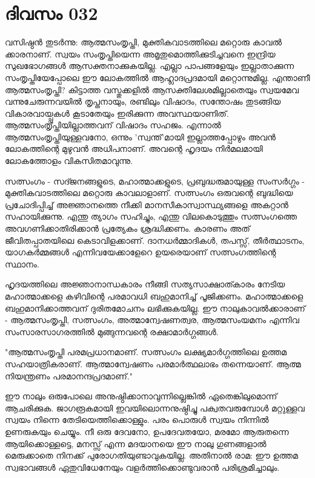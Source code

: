 \newpage
\section{ദിവസം 032}


വസിഷ്ഠന്‍ തുടര്‍ന്നു: ആത്മസംതൃപ്തി, മുക്തികവാടത്തിലെ മറ്റൊരു കാവല്‍ ക്കാരനാണ്‌. സ്വയം സംതൃപ്തിയെന്ന അമൃതുമൊത്തിക്കുടിച്ചവനെ ഇന്ദ്രിയ  സുഖഭോഗങ്ങള്‍ ആസക്തനാക്കുകയില്ല. എല്ലാ പാപങ്ങളേയും ഇല്ലാതാക്കുന്ന സംതൃപ്തിയേപ്പോലെ ഈ ലോകത്തില്‍ ആഹ്ലാദപ്രദമായി മറ്റൊന്നുമില്ല. എന്താണീ ആത്മസംതൃപ്തി? കിട്ടാത്ത വസ്തുക്കളില്‍ ആസക്തിലേശമില്ലാതെയും സ്വയമേവ വന്നുചേരുന്നവയില്‍ തൃപ്തനായും, രണ്ടിലും വിഷാദം, സന്തോഷം തുടങ്ങിയ വികാരവായ്പ്പുകള്‍ കൂടാതേയും ഇരിക്കുന്ന അവസ്ഥയാണിത്‌. ആത്മസംതൃപ്തിയില്ലാത്തവന്‌ വിഷാദം സഹജം. എന്നാല്‍ ആത്മസംതൃപ്തിയുള്ളവനോ, ഒന്നും 'സ്വന്ത്‌'മായി ഇല്ലാത്തപ്പോഴും അവന്‍ ലോകത്തിന്റെ മുഴുവന്‍ അധിപനാണ്‌. അവന്റെ ഹൃദയം നിര്‍മലമായി ലോകത്തോളം വികസിതമാവുന്നു.

സത്സംഗം - സദ്ജനങ്ങളുടെ, മഹാത്മാക്കളുടെ, പ്രബുദ്ധരുമായുള്ള സംസര്‍ഗ്ഗം - മുക്തികവാടത്തിലെ മറ്റൊരു കാവലാളാണ്‌. സത്സംഗം ഒരുവന്റെ ബുദ്ധിയെ പ്രചോദിപ്പിച്ച്‌ അജ്ഞാനത്തെ നീക്കി മാനസീകാസ്വാസ്ഥ്യങ്ങളെ അകറ്റാന്‍ സഹായിക്കുന്നു. എന്തു ത്യാഗം സഹിച്ചും, എന്തു വിലകൊടുത്തും സത്സംഗത്തെ അവഗണിക്കാതിരിക്കാന്‍ പ്രത്യേകം ശ്രദ്ധിക്കണം. കാരണം അത്‌ ജീവിതപ്പാതയിലെ കെടാവിളക്കാണ്‌. ദാനധര്‍മ്മാദികള്‍, തപസ്സ്‌, തീര്‍ത്ഥാടനം, യാഗകര്‍മ്മങ്ങള്‍ എന്നിവയേക്കാളേറെ ഉയരെയാണ്‌ സത്സംഗത്തിന്റെ സ്ഥാനം.

ഹൃദയത്തിലെ അജ്ഞാനാന്ധകാരം നീങ്ങി സത്യസാക്ഷാത്കാരം നേടിയ മഹാത്മാക്കളെ കഴിവിന്റെ പരമാവധി ബഹുമാനിച്ച്‌ പൂജിക്കണം. മഹാത്മാക്കളെ ബഹുമാനിക്കാത്തവന്‌ ദുരിതമോചനം ലഭിക്കുകയില്ല. ഈ നാലുകാവല്‍ക്കാരാണ്‌ - ആത്മസംതൃപ്തി, സത്സംഗം, അത്മാന്വേഷണത്വര, ആത്മസംയമനം എന്നിവ സംസാരസാഗരത്തില്‍ മുങ്ങുന്നവന്റെ രക്ഷാമാര്‍ഗ്ഗങ്ങള്‍. 

"ആത്മസംതൃപ്തി പരമപ്രധാനമാണ്‌. സത്സംഗം ലക്ഷ്യമാര്‍ഗ്ഗത്തിലെ ഉത്തമ സഹയാത്രികരാണ്‌. ആത്മാന്വേഷണം പരമാര്‍ത്ഥലാഭം തന്നെയാണ്‌. ആത്മ നിയന്ത്രണം പരമാനന്ദപ്രദമാണ്‌." 

ഈ നാലും ഒരുപോലെ അനുഷ്ഠിക്കാനാവുന്നില്ലെങ്കില്‍ ഏതെങ്കിലുമൊന്ന് ആചരിക്കുക. ജാഗരൂകമായി ഇവയിലൊന്നനുഷ്ഠിച്ചു പക്വതവരുമ്പോള്‍ മറ്റുള്ളവ സ്വയം നിന്നെ തേടിയെത്തിക്കൊള്ളും. പരം പൊരുള്‍ സ്വയം നിന്നില്‍ ഉണരുകയും ചെയ്യും. നീ ഒരു ദേവനോ, ഉപദേവതയോ, മരമോ ആരുതന്നെ ആയിക്കൊള്ളട്ടെ, മനസ്സ്‌ എന്ന മദയാനയെ ഈ നാലു ഗുണങ്ങളാല്‍ മെരുക്കാതെ നിനക്ക്‌ പുരോഗതിയുണ്ടാവുകയില്ല. അതിനാല്‍ രാമ: ഈ ഉത്തമ സ്വഭാവങ്ങള്‍ ഏതുവിധേനേയും വളര്‍ത്തിക്കൊണ്ടുവരാന്‍ പരിശ്രമിച്ചാലും. 
